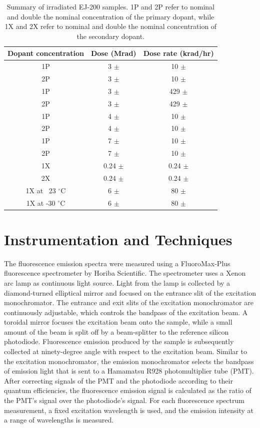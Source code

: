 \documentclass[preprint,12pt]{elsarticle}
\begin{document}
\begin{table}[!ht]
\centering
  \caption{Summary of irradiated EJ-200 samples. 
1P and 2P refer to nominal and double the nominal concentration of the primary dopant, 
while 1X and 2X refer to nominal and double the nominal concentration of the secondary dopant.}
  \begin{tabular}{c|c|c}
    \hline
    Dopant concentration 	    & Dose (Mrad)  		& Dose rate (krad/hr)    \\ \hline 
    1P     	    		    & 3 $\pm$  			& 10 $\pm$  	   	 \\ 
    2P     	    		    & 3 $\pm$  			& 10 $\pm$  	   	 \\ \hline
    1P				    & 3 $\pm$			& 429 $\pm$		 \\ 
    2P				    & 3 $\pm$			& 429 $\pm$		 \\ \hline
    1P     	    		    & 4 $\pm$  			& 10 $\pm$  	   	 \\ 
    2P     	    		    & 4 $\pm$  			& 10 $\pm$  	   	 \\ \hline
    1P				    & 7 $\pm$			& 10 $\pm$		 \\ 
    2P				    & 7 $\pm$			& 10 $\pm$		 \\ \hline
    1X     	    		    & 0.24 $\pm$  		& 0.24 $\pm$  	   	 \\ 
    2X     	    		    & 0.24 $\pm$  		& 0.24 $\pm$  	   	 \\ \hline
    1X at ~23 $^\circ$C		    & 6 $\pm$			& 80 $\pm$		 \\ 
    1X at -30 $^\circ$C		    & 6 $\pm$			& 80 $\pm$		 \\ \hline
    \hline
  \end{tabular}
  \label{table:samples}
\end{table}

\section{Instrumentation and Techniques}
The fluorescence emission spectra were measured using a FluoroMax-Plus fluorescence spectrometer by Horiba Scientific. 
The spectrometer uses a Xenon arc lamp as continuous light source. 
Light from the lamp is collected by a diamond-turned elliptical mirror and focused on the entrance slit of the excitation monochromator. 
The entrance and exit slits of the excitation monochromator are continuously adjustable, 
which controls the bandpass of the excitation beam. 
A toroidal mirror focuses the excitation beam onto the sample, while a small amount of the beam is split off by a beam-splitter 
to the reference silicon photodiode. 
Fluorescence emission produced by the sample is subsequently collected at ninety-degree angle with respect to the excitation beam. 
Similar to the excitation monochromator, the emission monochromator selects the bandpass of emission light that is sent to 
a Hamamatsu R928 photomultiplier tube (PMT). 
After correcting signals of the PMT and the photodiode according to their quantum efficiencies, 
the fluorescence emission signal is calculated as the ratio of the PMT's signal over the photodiode's signal. 
For each fluorescence spectrum measurement, a fixed excitation wavelength is used, 
and the emission intensity at a range of wavelengths is measured. 
\end{document}
